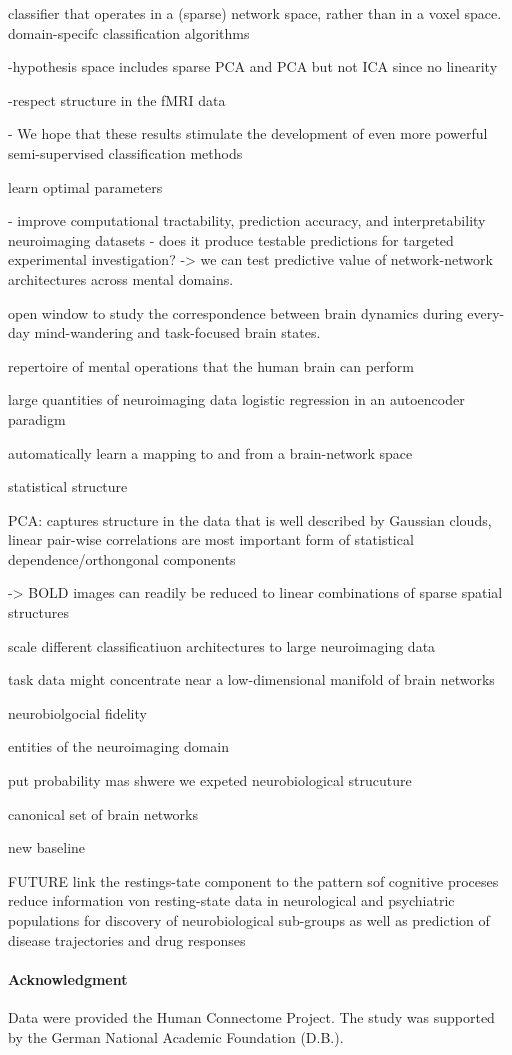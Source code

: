 \documentclass{article} %
\begin{document}
classifier that operates in a (sparse) network space, rather than in a voxel space.
domain-specifc classification algorithms

-hypothesis space includes sparse PCA and PCA but not ICA since no
linearity

-respect structure in the fMRI data

- We hope that these results stimulate the development of
even more powerful semi-supervised classification methods

learn optimal parameters


- improve computational tractability, prediction accuracy, and interpretability
neuroimaging datasets
- does it produce testable predictions for targeted experimental investigation?
-> we can test predictive value of network-network architectures across
mental domains.

open window to study the correspondence between brain dynamics during
every-day mind-wandering and task-focused brain states.


repertoire of mental operations that the human brain can perform

large quantities of neuroimaging data
logistic regression in an autoencoder paradigm

automatically learn a mapping to and from a brain-network space

statistical structure

PCA:
captures structure in the data that is well described by Gaussian clouds,
linear pair-wise correlations are most important form of statistical
dependence/orthongonal components

-> BOLD images can readily be reduced to linear combinations of
sparse spatial structures

scale different classificatiuon architectures to large neuroimaging data

task data might concentrate near a low-dimensional manifold of brain networks

neurobiolgocial fidelity

entities of the neuroimaging domain

put probability mas shwere we expeted neurobiological strucuture

canonical set of brain networks

new baseline

FUTURE
link the restings-tate component to the pattern sof cognitive proceses
reduce information von resting-state data in neurological and psychiatric
populations for discovery of neurobiological sub-groups as well as
prediction of disease trajectories and drug responses


%
\paragraph{Acknowledgment}
{\small
Data were provided the Human Connectome Project. The study was supported
by the German National Academic Foundation (D.B.).
}

\small


\end{document}
